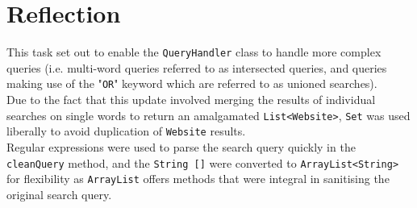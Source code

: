 \section{Reflection} %
This task set out to enable the {\tt QueryHandler} class to handle more complex queries (i.e. multi-word queries referred to as intersected queries, and queries making use of the "{\tt OR}" keyword which are referred to as unioned searches).\\
Due to the fact that this update involved merging the results of individual searches on single words to return an amalgamated {\tt List<Website>}, {\tt Set} was used liberally to avoid duplication of {\tt Website} results.\\
Regular expressions were used to parse the search query quickly in the {\tt cleanQuery} method, and the {\tt String []} were converted to {\tt ArrayList<String>} for flexibility as {\tt ArrayList} offers methods that were integral in sanitising the original search query.